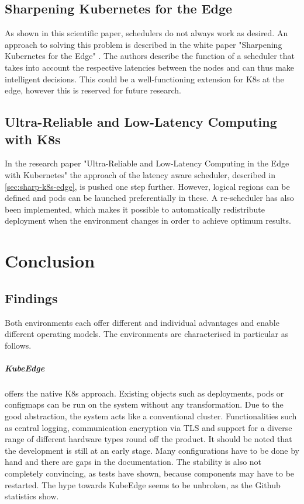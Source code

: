 \documentclass[MIC,Master,english]{twbook}%
\begin{document}
\section{Sharpening Kubernetes for the Edge}
\label{sec:sharp-k8s-edge}
As shown in this scientific paper, schedulers do not always work as desired. An approach to solving this problem is described in the white paper "Sharpening Kubernetes for the Edge" \cite{k8s-sharping-edge}. The authors describe the function of a scheduler that takes into account the respective latencies between the nodes and can thus make intelligent decisions. This could be a well-functioning extension for K8s at the edge, however this is reserved for future research.


\section{Ultra-Reliable and Low-Latency Computing with K8s}
\label{sec:ultra-low-k8s}
In the research paper "Ultra-Reliable and Low-Latency Computing in the Edge with Kubernetes" \cite{k8s-latency-sched} the approach of the latency aware scheduler, described in \autoref{sec:sharp-k8s-edge}, is pushed one step further. However, logical regions can be defined and pods can be launched preferentially in these. A re-scheduler has also been implemented, which makes it possible to automatically redistribute deployment when the environment changes in order to achieve optimum results.

\pagebreak
\chapter{Conclusion}
\label{chap:results}

\section{Findings}
\label{sec:findings}
Both environments each offer different and individual advantages and enable different operating models. The environments are characterised in particular as follows.

\paragraph{KubeEdge} offers the native \ac{K8s} approach. Existing objects such as deployments, pods or configmaps can be run on the system without any transformation. Due to the good abstraction, the system acts like a conventional cluster. Functionalities such as central logging, communication encryption via TLS and support for a diverse range of different hardware types round off the product. It should be noted that the development is still at an early stage. Many configurations have to be done by hand and there are gaps in the documentation. The stability is also not completely convincing, as tests have shown, because components may have to be restarted. The hype towards KubeEdge seems to be unbroken, as the Github statistics show.
\end{document}
